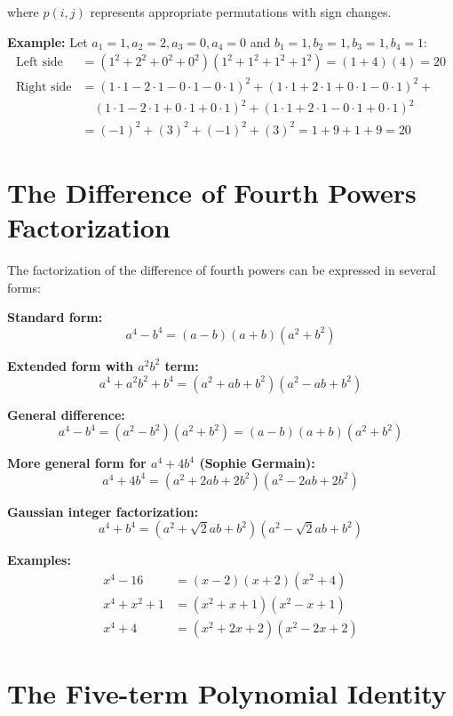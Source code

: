 where \(p(i,j)\) represents appropriate permutations with sign changes.

\textbf{Example:} Let \(a_1=1, a_2=2, a_3=0, a_4=0\) and \(b_1=1, b_2=1, b_3=1, b_4=1\):
\begin{align*}
\text{Left side} &= (1^2 + 2^2 + 0^2 + 0^2)(1^2 + 1^2 + 1^2 + 1^2) = (1+4)(4) = 20 \\
\text{Right side} &= (1\cdot1 - 2\cdot1 - 0\cdot1 - 0\cdot1)^2 + (1\cdot1 + 2\cdot1 + 0\cdot1 - 0\cdot1)^2 + \\
&\quad (1\cdot1 - 2\cdot1 + 0\cdot1 + 0\cdot1)^2 + (1\cdot1 + 2\cdot1 - 0\cdot1 + 0\cdot1)^2 \\
&= (-1)^2 + (3)^2 + (-1)^2 + (3)^2 = 1 + 9 + 1 + 9 = 20
\end{align*}


\section{The Difference of Fourth Powers Factorization}

The factorization of the difference of fourth powers can be expressed in several forms:

\textbf{Standard form:}
\[
a^4 - b^4 = (a - b)(a + b)(a^2 + b^2)
\]

\textbf{Extended form with \(a^2b^2\) term:}
\[
a^4 + a^2b^2 + b^4 = (a^2 + ab + b^2)(a^2 - ab + b^2)
\]

\textbf{General difference:}
\[
a^4 - b^4 = (a^2 - b^2)(a^2 + b^2) = (a - b)(a + b)(a^2 + b^2)
\]

\textbf{More general form for \(a^4 + 4b^4\) (Sophie Germain):}
\[
a^4 + 4b^4 = (a^2 + 2ab + 2b^2)(a^2 - 2ab + 2b^2)
\]

\textbf{Gaussian integer factorization:}
\[
a^4 + b^4 = (a^2 + \sqrt{2}ab + b^2)(a^2 - \sqrt{2}ab + b^2)
\]

\textbf{Examples:}
\begin{align*}
x^4 - 16 &= (x-2)(x+2)(x^2+4) \\
x^4 + x^2 + 1 &= (x^2 + x + 1)(x^2 - x + 1) \\
x^4 + 4 &= (x^2 + 2x + 2)(x^2 - 2x + 2)
\end{align*}


\section{The Five-term Polynomial Identity}


